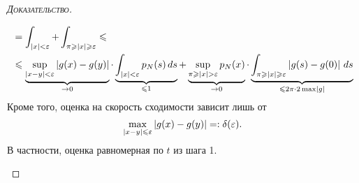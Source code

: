 \documentclass[../complex-analysis.tex]{subfiles}
\begin{document}
\begin{proof}[\normalfont\textsc{Доказательство}]
\begin{enumerate}
\begin{align*}
    &= \int_{\left| x \right| < \varepsilon}   + \int_{\pi \geqslant \left| x \right| \geqslant \varepsilon}  \leqslant \\
    &\leqslant \underbrace{\sup_{\left| x-y \right| < \varepsilon} \left| g(x)-g(y) \right|}_{\to 0} \cdot \underbrace{\int_{\left| x \right| < \varepsilon}   p_N(s)\,ds}_{\leqslant 1} + \underbrace{\sup_{\pi \geqslant \left| x \right| > \varepsilon} p_N(x)}_{\to 0} \cdot \underbrace{\int_{\pi \geqslant \left| x \right|\geqslant \varepsilon}  \left| g(s)-g(0) \right|\,ds}_{\leqslant 2\pi \cdot 2 \max \left| g \right|}
   \end{align*}Кроме того, оценка на скорость сходимости зависит лишь от
 \begin{align*}
  \max_{\left| x-y \right| \leqslant \varepsilon} \left| g(x)-g(y) \right| =: \delta(\varepsilon).
 \end{align*} В частности, оценка равномерная по $ t $ из шага 1.


\end{enumerate}
\end{proof}
\end{document}
